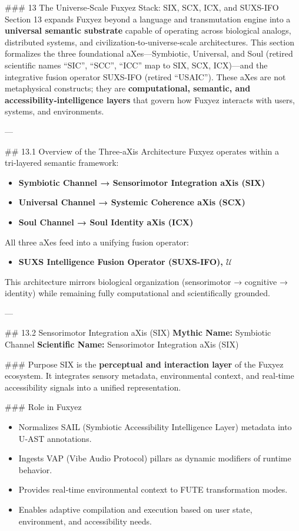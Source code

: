 \documentclass[12pt, a4paper]{book}
\begin{document}
    
    \#\#\# 13 The Universe‑Scale Fuxyez Stack: SIX, SCX, ICX, and SUXS-IFO  
Section 13 expands Fuxyez beyond a language and transmutation engine into a \textbf{universal semantic substrate} capable of operating across biological analogs, distributed systems, and civilization‑to‑universe‑scale architectures. This section formalizes the three foundational aXes—Symbiotic, Universal, and Soul (retired scientific names ``SIC'', ``SCC'', ``ICC'' map to SIX, SCX, ICX)—and the integrative fusion operator SUXS-IFO (retired ``USAIC''). These aXes are not metaphysical constructs; they are \textbf{computational, semantic, and accessibility‑intelligence layers} that govern how Fuxyez interacts with users, systems, and environments.

---

\#\# 13.1 Overview of the Three‑aXis Architecture  
Fuxyez operates within a tri‑layered semantic framework:

\begin{itemize}
  \item \textbf{Symbiotic Channel → Sensorimotor Integration aXis (SIX)}  
  \item \textbf{Universal Channel → Systemic Coherence aXis (SCX)}  
  \item \textbf{Soul Channel → Soul Identity aXis (ICX)}  
\end{itemize}

All three aXes feed into a unifying fusion operator:

\begin{itemize}
  \item \textbf{SUXS Intelligence Fusion Operator (SUXS-IFO), $\mathcal{U}$}  
\end{itemize}

This architecture mirrors biological organization (sensorimotor → cognitive → identity) while remaining fully computational and scientifically grounded.

---

\#\# 13.2 Sensorimotor Integration aXis (SIX)  
\textbf{Mythic Name:} Symbiotic Channel  
\textbf{Scientific Name:} Sensorimotor Integration aXis (SIX)

\#\#\# Purpose  
SIX is the \textbf{perceptual and interaction layer} of the Fuxyez ecosystem. It integrates sensory metadata, environmental context, and real‑time accessibility signals into a unified representation.

\#\#\# Role in Fuxyez  
\begin{itemize}
  \item Normalizes SAIL (Symbiotic Accessibility Intelligence Layer) metadata into U‑AST annotations.  
  \item Ingests VAP (Vibe Audio Protocol) pillars as dynamic modifiers of runtime behavior.  
  \item Provides real‑time environmental context to FUTE transformation modes.  
  \item Enables adaptive compilation and execution based on user state, environment, and accessibility needs.
\end{itemize}
\end{document}
